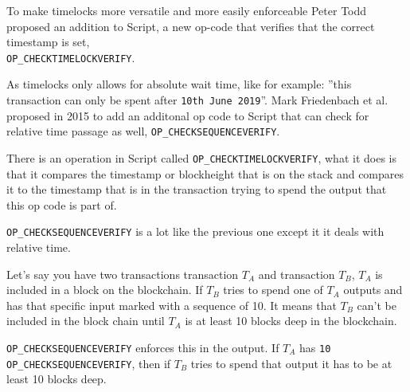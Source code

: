 To make timelocks more versatile and more easily enforceable Peter Todd proposed an addition to Script, a new op-code that verifies that the correct timestamp is set, \\\texttt{OP\_CHECKTIMELOCKVERIFY}.

As timelocks only allows for absolute wait time, like for example: ''this transaction can only be spent after \texttt{10th June 2019}''. Mark Friedenbach et al. proposed in 2015 to add an additonal op code to Script that can check for relative time passage as well, \texttt{OP\_CHECKSEQUENCEVERIFY}.

There is an operation in Script called \texttt{OP\_CHECKTIMELOCKVERIFY}, what it does is that it compares the timestamp or blockheight that is on the stack and compares it to the timestamp that is in the transaction trying to spend the output that this op code is part of.\cite{antonopoulos_2017}\cite{checklocktime}\cite{script_wiki}\cite{bitcoin_core_tx}

\texttt{OP\_CHECKSEQUENCEVERIFY} is a lot like the previous one except it it deals with relative time. 

Let's say you have two transactions transaction $T_A$ and transaction $T_B$, $T_A$ is included in a block on the blockchain. If $T_B$ tries to spend one of $T_A$ outputs and has that specific input marked with a  sequence of 10. It means that $T_B$ can't be included in the block chain until $T_A$ is at least 10 blocks deep in the blockchain.\cite{antonopoulos_2017}\cite{checksequence}\cite{script_wiki}\cite{bitcoin_core_tx}

\texttt{OP\_CHECKSEQUENCEVERIFY} enforces this in the output. If $T_A$ has \texttt{10 OP\_CHECKSEQUENCEVERIFY}, then if $T_B$ tries to spend that output it has to be at least 10 blocks deep.
